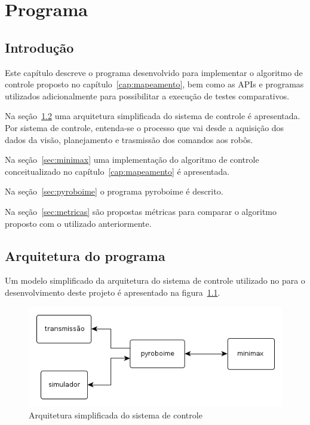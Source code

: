 \chapter{Programa}\label{cap:programa}

\section{Introdução}

Este capítulo descreve o programa desenvolvido para implementar o algoritmo de
controle proposto no capítulo~\ref{cap:mapeamento}, bem como as APIs e programas
utilizados adicionalmente para possibilitar a execução de testes comparativos.

Na seção~\ref{sec:arq_prog} uma arquitetura simplificada do sistema de controle
é apresentada.  Por sistema de controle, entenda-se o processo que vai desde a
aquisição dos dados da visão, planejamento e trasmissão dos comandos aos robôs.

Na seção~\ref{sec:minimax} uma implementação do algoritmo de controle
conceitualizado no capítulo~\ref{cap:mapeamento} é apresentada.

Na seção~\ref{sec:pyroboime} o programa pyroboime é descrito.

Na seção~\ref{sec:metricas} são propostas métricas para comparar o algoritmo
proposto com o utilizado anteriormente.

\section{Arquitetura do programa}\label{sec:arq_prog}

Um modelo simplificado da arquitetura do sistema de controle utilizado no para
o desenvolvimento deste projeto é apresentado na figura~\ref{fig:arq_prog}.

\begin{figure}
  \centering
  \includegraphics[width=0.8 \linewidth]{img/arq_geral_prog}
  \caption{Arquitetura simplificada do sistema de controle}\label{fig:arq_prog}
\end{figure}

